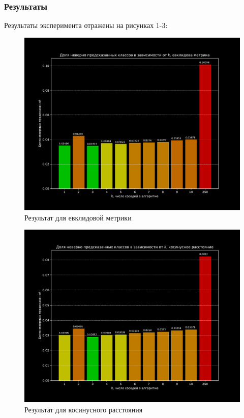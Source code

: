 \documentclass{article}
\begin{document}
        \subsubsection{Результаты}
                Результаты эксперимента отражены на рисунках 1-3:
                \begin{figure}[H]
                    \centering
                    \includegraphics[width=0.8\linewidth]{./pictures/Euclidean.pdf}
                    \caption{Результат для евклидовой метрики}
                    \label{fig:mpr}
                \end{figure}

                \begin{figure}[H]
                    \centering
                    \includegraphics[width=0.8\linewidth]{./pictures/Cosine.pdf}
                    \caption{Результат для косинусного расстояния}
                    \label{fig:mpr}
                \end{figure}
\end{document}
